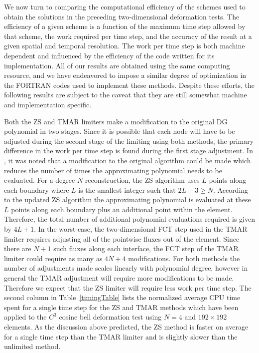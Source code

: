 \documentclass{ametsoc}
\begin{document}
We now turn to comparing the computational efficiency of the schemes used to obtain the solutions in the preceding two-dimensional deformation tests. The efficiency of a given scheme is a function of the maximum time step allowed by that scheme, the work required per time step, and the accuracy of the result at a given spatial and temporal resolution.  The work per time step is both machine dependent and influenced by the efficiency of the code written for its implementation. All of our results are obtained using the same computing resource, and we have endeavored to impose a similar degree of optimization in the FORTRAN codes used to implement these methods. Despite these efforts, the following results are subject to the caveat that they are still somewhat machine and implementation specific.

Both the ZS and TMAR limiters make a modification to the original DG polynomial in two stages. Since it is possible that each node will have to be adjusted during the second stage of the limiting using both methods, the primary difference in the work per time step is found during the first stage adjustment. In \cite{Zhang:2011aa}, it was noted that a modification to the original algorithm could be made which reduces the number of times the approximating polynomial needs to be evaluated. For a degree $N$ reconstruction, the ZS algorithm uses $L$ points along each boundary where $L$ is the smallest integer such that $2L-3 \geq N$. According to the updated ZS algorithm the approximating polynomial is evaluated at these $L$ points along each boundary plus an additional point within the element. Therefore, the total number of additional polynomial evaluations required is given by $4L+1$. In the worst-case, the two-dimensional FCT step used in the TMAR limiter requires adjusting all of the pointwise fluxes out of the element. Since there are $N+1$ such fluxes along each interface, the FCT step of the TMAR limiter could require as many as $4N+4$ modifications. For both methods the number of adjustments made scales linearly with polynomial degree, however in general the TMAR adjustment will require more modifications to be made. Therefore we expect that the ZS limiter will require less work per time step. The second column in Table~\ref{timingTable} lists the normalized average CPU time spent for a single time step for the ZS and TMAR methods which have been applied to the $C^3$ cosine bell deformation test using $N=4$ and $192\times192$ elements. As the discussion above predicted, the ZS method is faster on average for a single time step than the TMAR limiter and is slightly slower than the unlimited method. 
\end{document}
